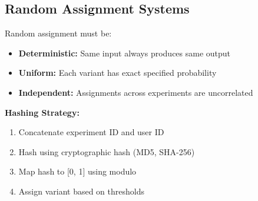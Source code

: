 \subsection{Random Assignment Systems}

Random assignment must be:
\begin{itemize}
    \item \textbf{Deterministic:} Same input always produces same output
    \item \textbf{Uniform:} Each variant has exact specified probability
    \item \textbf{Independent:} Assignments across experiments are uncorrelated
\end{itemize}

\textbf{Hashing Strategy:}

\begin{enumerate}
    \item Concatenate experiment ID and user ID
    \item Hash using cryptographic hash (MD5, SHA-256)
    \item Map hash to [0, 1] using modulo
    \item Assign variant based on thresholds
\end{enumerate}

